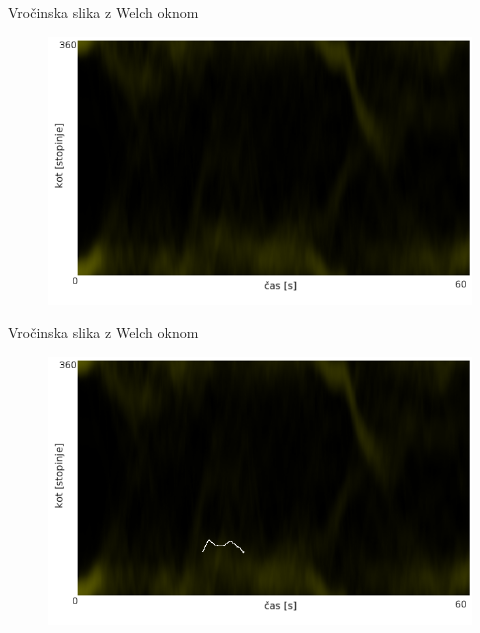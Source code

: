 \begin{frame}{Vročinska slika z Welch oknom}
  \begin{figure}
    \includegraphics[scale=0.67]{img/hm-we.png}
  \end{figure}
\end{frame}

\begin{frame}{Vročinska slika z Welch oknom}
  \begin{figure}
    \includegraphics[scale=0.67]{img/hm-wet.png}
  \end{figure}
\end{frame}

